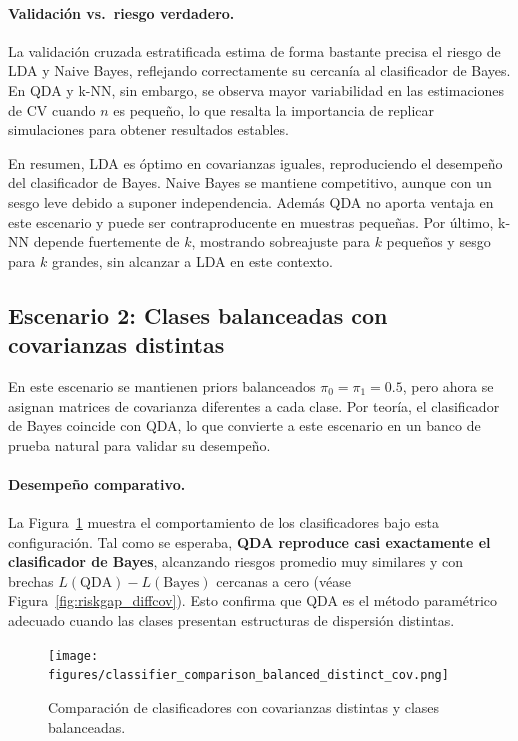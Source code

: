 \documentclass[10pt]{article}
\begin{document}
\paragraph{Validación vs.\ riesgo verdadero.}
La validación cruzada estratificada estima de forma bastante precisa el riesgo de LDA y Naive Bayes, 
reflejando correctamente su cercanía al clasificador de Bayes. 
En QDA y k-NN, sin embargo, se observa mayor variabilidad en las estimaciones de CV cuando $n$ es pequeño, 
lo que resalta la importancia de replicar simulaciones para obtener resultados estables.

En resumen, LDA es óptimo en covarianzas iguales, reproduciendo el desempeño del clasificador de Bayes. Naive Bayes se mantiene competitivo, aunque con un sesgo leve debido a suponer independencia. Además QDA no aporta ventaja en este escenario y puede ser contraproducente en muestras pequeñas. Por último, k-NN depende fuertemente de $k$, mostrando sobreajuste para $k$ pequeños y sesgo para $k$ grandes, sin alcanzar a LDA en este contexto.

\subsection*{Escenario 2: Clases balanceadas con covarianzas distintas}

En este escenario se mantienen priors balanceados $\pi_0=\pi_1=0.5$, pero ahora se asignan matrices de covarianza diferentes a cada clase. 
Por teoría, el clasificador de Bayes coincide con QDA, lo que convierte a este escenario en un banco de prueba natural para validar su desempeño.

\paragraph{Desempeño comparativo.}
La Figura~\ref{fig:risk_diffcov} muestra el comportamiento de los clasificadores bajo esta configuración. 
Tal como se esperaba, \textbf{QDA reproduce casi exactamente el clasificador de Bayes}, alcanzando riesgos promedio muy similares y con brechas $L(\text{QDA})-L(\text{Bayes})$ cercanas a cero (véase Figura~\ref{fig:riskgap_diffcov}). 
Esto confirma que QDA es el método paramétrico adecuado cuando las clases presentan estructuras de dispersión distintas.

\begin{figure}[H]
    \centering
    \texttt{[image: figures/classifier\_comparison\_balanced\_distinct\_cov.png]}
    \caption{Comparación de clasificadores con covarianzas distintas y clases balanceadas.}
    \label{fig:risk_diffcov}
\end{figure}
\end{document}
